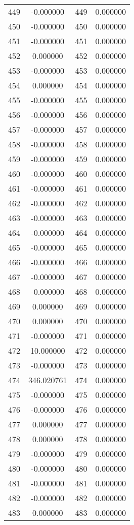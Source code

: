 \documentclass[12pt]{article}
\begin{document}
\begin{longtable}{@{}cccc@{}}
449 & -0.000000 & 449 & 0.000000 \\
450 & -0.000000 & 450 & 0.000000 \\
451 & -0.000000 & 451 & 0.000000 \\
452 & 0.000000 & 452 & 0.000000 \\
453 & -0.000000 & 453 & 0.000000 \\
454 & 0.000000 & 454 & 0.000000 \\
455 & -0.000000 & 455 & 0.000000 \\
456 & -0.000000 & 456 & 0.000000 \\
457 & -0.000000 & 457 & 0.000000 \\
458 & -0.000000 & 458 & 0.000000 \\
459 & -0.000000 & 459 & 0.000000 \\
460 & -0.000000 & 460 & 0.000000 \\
461 & -0.000000 & 461 & 0.000000 \\
462 & -0.000000 & 462 & 0.000000 \\
463 & -0.000000 & 463 & 0.000000 \\
464 & -0.000000 & 464 & 0.000000 \\
465 & -0.000000 & 465 & 0.000000 \\
466 & -0.000000 & 466 & 0.000000 \\
467 & -0.000000 & 467 & 0.000000 \\
468 & -0.000000 & 468 & 0.000000 \\
469 & 0.000000 & 469 & 0.000000 \\
470 & 0.000000 & 470 & 0.000000 \\
471 & -0.000000 & 471 & 0.000000 \\
472 & 10.000000 & 472 & 0.000000 \\
473 & -0.000000 & 473 & 0.000000 \\
474 & 346.020761 & 474 & 0.000000 \\
475 & -0.000000 & 475 & 0.000000 \\
476 & -0.000000 & 476 & 0.000000 \\
477 & 0.000000 & 477 & 0.000000 \\
478 & 0.000000 & 478 & 0.000000 \\
479 & -0.000000 & 479 & 0.000000 \\
480 & -0.000000 & 480 & 0.000000 \\
481 & -0.000000 & 481 & 0.000000 \\
482 & -0.000000 & 482 & 0.000000 \\
483 & 0.000000 & 483 & 0.000000 \\

\end{longtable}
\end{document}
